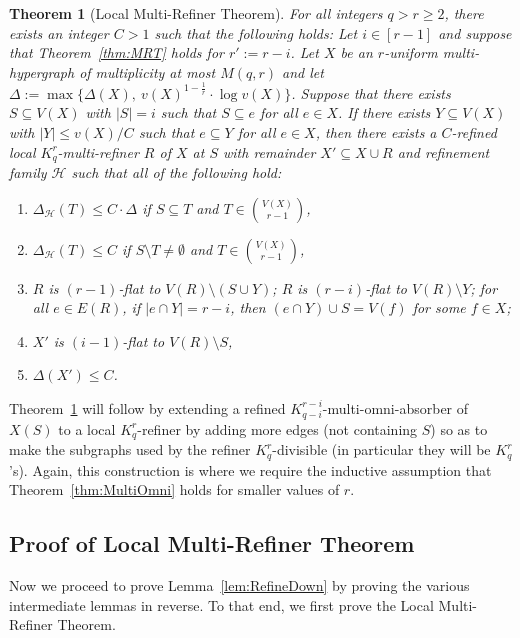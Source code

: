 \documentclass[11pt]{article}
\newcounter{i}
\theoremstyle{plain}
\newtheorem{thm}{Theorem}[section]
\theoremstyle{plain} %
\theoremstyle{definition}
\begin{document}
\begin{thm}[Local Multi-Refiner Theorem]\label{thm:MLRT}
For all integers $q > r \ge 2$, there exists an integer $C > 1$ such that the following holds: Let $i\in [r-1]$ and suppose that Theorem~\ref{thm:MRT} holds for $r':=r-i$. Let $X$ be an $r$-uniform multi-hypergraph of multiplicity at most $M(q,r)$ and let $\Delta:= \max\{\Delta(X),~v(X)^{1-\frac{1}{r}}\cdot \log v(X)\}$. Suppose that there exists $S\subseteq V(X)$ with $|S|=i$ such that $S\subseteq e$ for all $e\in X$. If there exists $Y\subseteq V(X)$ with $|Y|\le  v(X)/C$ such that $e\subseteq Y$ for all $e\in X$, then there exists a $C$-refined local $K_q^r$-multi-refiner $R$ of $X$ at $S$ with remainder $X'\subseteq X\cup R$ and refinement family $\mathcal{H}$ such that all of the following hold: 
\begin{enumerate}
    \item[(1)] $\Delta_{\mathcal{H}}(T) \le C \cdot \Delta$ if $S\subseteq T$ and $T\in \binom{V(X)}{r-1}$,
    \item[(2)] $\Delta_{\mathcal{H}}(T) \le C$ if $S\setminus T\ne \emptyset$ and $T\in \binom{V(X)}{r-1}$,
    \item[(3)] $R$ is $(r-1)$-flat to $V(R)\setminus (S\cup Y)$; $R$ is $(r-i)$-flat to $V(R)\setminus Y$; for all $e\in E(R)$, if $|e\cap Y|=r-i$, then $(e\cap Y)\cup S = V(f)$ for some $f\in X$; 
    \item[(4)] $X'$ is $(i-1)$-flat to $V(R)\setminus S$,
    \item[(5)] $\Delta(X')\le C$.
\end{enumerate}      
\end{thm}

Theorem~\ref{thm:MLRT} will follow by extending a refined $K_{q-i}^{r-i}$-multi-omni-absorber of $X(S)$ to a local $K_q^r$-refiner by adding more edges (not containing $S$) so as to make the subgraphs used by the refiner $K_q^r$-divisible (in particular they will be $K_q^r$'s). Again, this construction is where we require the inductive assumption that Theorem~\ref{thm:MultiOmni} holds for smaller values of $r$. 

\subsection{Proof of Local Multi-Refiner Theorem}

Now we proceed to prove Lemma~\ref{lem:RefineDown} by proving the various intermediate lemmas in reverse. To that end, we first prove the Local Multi-Refiner Theorem. 
\end{document}
